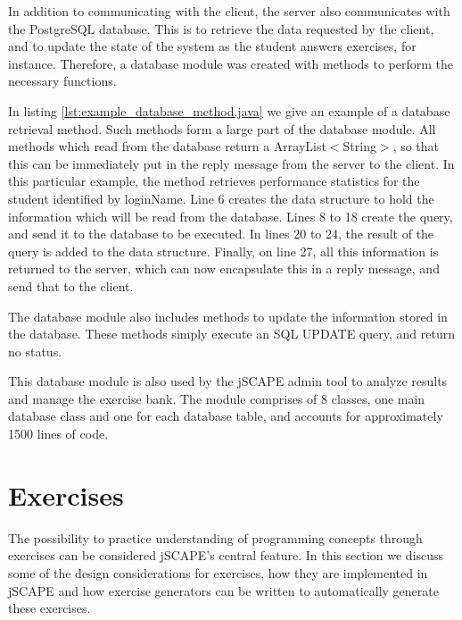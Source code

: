 

In addition to communicating with the client, the server also communicates with the PostgreSQL database. This is to retrieve the data requested by the client, and to update the state of the system as the student answers exercises, for instance. Therefore, a database module was created with methods to perform the necessary functions. \newline



In listing \ref{lst:example_database_method.java} we give an example of a database retrieval method. Such methods form a large part of the database module. All methods which read from the database return a \textsf{ArrayList$<$String$>$}, so that this can be immediately put in the reply message from the server to the client. In this particular example, the method retrieves performance statistics for the student identified by \textsf{loginName}. Line 6 creates the data structure to hold the information which will be read from the database. Lines 8 to 18 create the query, and send it to the database to be executed. In lines 20 to 24, the result of the query is added to the data structure. Finally, on line 27, all this information is returned to the server, which can now encapsulate this in a reply message, and send that to the client.\newline

The database module also includes methods to update the information stored in the database. These methods simply execute an SQL \textsf{UPDATE} query, and return no status. \newline

This database module is also used by the jSCAPE admin tool to analyze results and manage the exercise bank. The module comprises of 8 classes, one main database class and one for each database table, and accounts for approximately 1500 lines of code.

\section{Exercises}
The possibility to practice understanding of programming concepts through exercises can be considered jSCAPE's central feature. In this section we discuss some of the design considerations for exercises, how they are implemented in jSCAPE and how exercise generators can be written to automatically generate these exercises.

